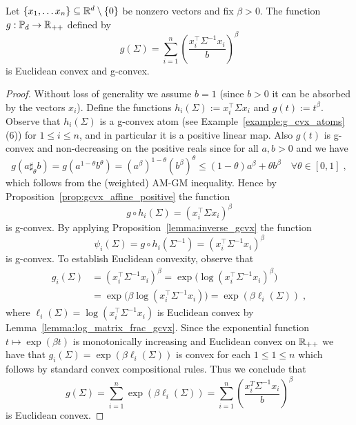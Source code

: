 \documentclass[sn-nature]{sn-jnl}%
\theoremstyle{thmstyleone}%
\theoremstyle{thmstyletwo}%
\theoremstyle{thmstylethree}%
\begin{document}
\begin{lemma}\label{lemma:matrix_frac_power_gcvx}
    Let $\{x_1, \ldots x_n\} \subseteq \mathbb{R}^{d} \setminus \{0\}$ be nonzero vectors and fix $\beta > 0$. The function $g: \mathbb{P}_d \to \mathbb{R}_{++}$ defined by
    \[
    g(\Sigma) = \sum_{i=1}^n \left(\frac{x_i^\top \Sigma^{-1} x_i}{b }\right)^{\beta}
    \]
    is Euclidean convex and g-convex.
\end{lemma}

\begin{proof}
    Without loss of generality we assume $b=1$ (since $b>0$ it can be absorbed by the vectors $x_i$). Define the functions 
    $h_i(\Sigma) := {x_i^\top \Sigma x_i}$ and $g(t) := t^{\beta}$.
    Observe that $h_i(\Sigma)$ is a g-convex atom (see Example~\ref{example:g_cvx_atoms}(6)) for $1 \leq i \leq n$, and in particular it is a positive linear map. Also $g(t)$ is g-convex and non-decreasing on the positive reals since for all $a,b >0$ and we have
    \[
    g\left(a \sharp_\theta b\right)=g\left(a^{1-\theta} b^\theta\right)=\left(a^\beta\right)^{1-\theta}\left(b^\beta\right)^\theta \leq(1-\theta) a^\beta+\theta b^\beta \quad \forall \theta \in[0,1] \; ,
    \]
    which follows from the (weighted) AM-GM inequality. Hence by Proposition~\ref{prop:gcvx_affine_positive} the function 
    \[
    g \circ h_i (\Sigma) = \left(x_i^\top \Sigma x_i \right)^\beta
    \]
    is g-convex. By applying Proposition~\ref{lemma:inverse_gcvx} the function 
    \[
    \psi_i(\Sigma) = g \circ h_i(\Sigma^{-1}) =  \left(x_i^\top \Sigma^{-1}x_i\right)^\beta
    \]
    is g-convex.    To establish Euclidean convexity, observe that 
    \begin{align*}
        g_i(\Sigma) &= \left( x_i^\top \Sigma^{-1}x_i \right)^{\beta} = \exp \bigg( \log \left( x_i^\top \Sigma^{-1}x_i \right)^{\beta }  \bigg)  \\
        &= \exp \bigg( \beta \log \left( x_i^\top \Sigma^{-1}x_i \right)  \bigg)  = \exp(\beta \ell_i(\Sigma)) \; ,
    \end{align*}
    where $\ell_i(\Sigma) = \log \left(x_i^\top \Sigma^{-1} x_i\right)$ is Euclidean convex by Lemma~\ref{lemma:log_matrix_frac_gcvx}.
     Since the exponential function $t \mapsto \exp(\beta t)$ is monotonically increasing and Euclidean convex on $\mathbb{R}_{++}$ we have that
   $g_i(\Sigma) = \exp (\beta \ell_i(\Sigma))$ is convex for each $1 \leq 1 \leq n$ which follows by standard convex compositional rules. Thus we conclude that 
    \[
    g(\Sigma) = \sum_{i=1}^n \exp(\beta  
    \ell_i(\Sigma)) =\sum_{i=1}^n\left(\frac{x_i^T \Sigma^{-1} x_i}{b}\right)^\beta
    \]
    is Euclidean convex.
\end{proof}
\end{document}
